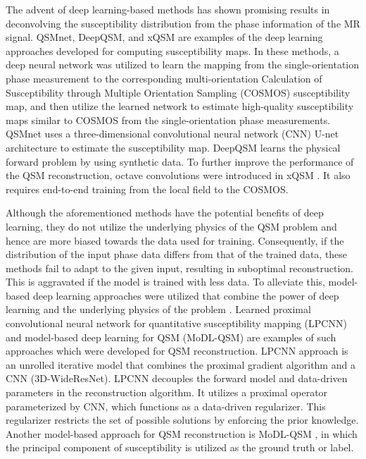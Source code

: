 \documentclass[sn-vancouver,Numbered]{sn-jnl}%
\begin{document}
 The advent of deep learning-based methods has shown promising results in deconvolving the susceptibility distribution from the phase information of the MR signal. QSMnet\cite{yoon2018quantitative}, DeepQSM\cite{deepqsm}, and xQSM \cite{Gao2021} are examples of the deep learning approaches developed for computing susceptibility maps. In these methods, a deep neural network was utilized to learn the mapping from the single-orientation phase measurement to the corresponding multi-orientation Calculation of Susceptibility through Multiple Orientation Sampling (COSMOS) \cite{liu2009calculation} susceptibility map, and then utilize the learned network to estimate high-quality susceptibility maps similar to COSMOS from the single-orientation phase measurements. QSMnet uses a three-dimensional convolutional neural network (CNN) U-net \cite{unet} architecture to estimate the susceptibility map. DeepQSM learns the physical forward problem by using synthetic data. To further improve the performance of the QSM reconstruction, octave convolutions were introduced in xQSM \cite{Gao2021}. It also requires end-to-end training from the local field to the COSMOS. 

 Although the aforementioned methods have the potential benefits of deep learning, they do not utilize the underlying physics of the QSM problem and hence are more biased towards the data used for training. Consequently, if the distribution of the input phase data differs from that of the trained data, these methods fail to adapt to the given input, resulting in suboptimal reconstruction. This is aggravated if the model is trained with less data. To alleviate this, model-based deep learning approaches were utilized that combine the power of deep learning and the underlying physics of the problem \cite{MoDL}. Learned proximal convolutional neural network for quantitative susceptibility mapping (LPCNN)\cite{lai2020learned} and model-based deep learning for QSM (MoDL-QSM) are examples of such approaches which were developed for QSM reconstruction. LPCNN approach is an unrolled iterative model that combines the proximal gradient algorithm and a CNN (3D-WideResNet). LPCNN decouples the forward model and data-driven parameters in the reconstruction algorithm. It utilizes a proximal operator parameterized by CNN, which functions as a data-driven regularizer. This regularizer restricts the set of possible solutions by enforcing the prior knowledge. Another model-based approach for QSM reconstruction is MoDL-QSM \cite{modl_qsm}, in which the principal component of susceptibility is utilized as the ground truth or label. 
\end{document}
